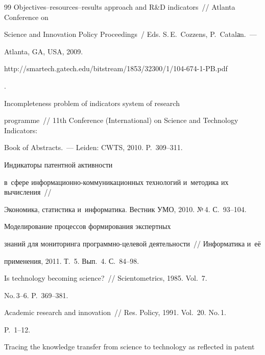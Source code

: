 {{\begin{thebibliography}{99}
Objectives--resources--results approach and R\&D indicators~/\!\!/  Atlanta Conference on 


Science and Innovation Policy Proceedings~/ Eds. S.\,E.~Cozzens, P.~Catalаn.~---


Atlanta, GA, USA, 2009.


{\sf 


http://smartech.gatech.edu/bitstream/1853/32300/1/104-674-1-PB.pdf}.




 Incompleteness problem of indicators system of research 


programme~/\!\!/ 11th Conference (International) on Science and Technology Indicators: 


Book of Abstracts.~--- Leiden: CWTS, 2010. P.~309--311.




 Индикаторы патентной активности 


в~сфере информационно-коммуникационных технологий и~методика их вычисления~/\!\!/ 


Экономика, статистика и~информатика. Вестник УМО, 2010. №\,4. С.~93--104.




 Моделирование процессов формирования экспертных 


знаний для мониторинга про\-грам\-мно-це\-ле\-вой деятельности~/\!\!/ Информатика и~её 


применения, 2011. Т.~5. Вып.~4. С.~84--98.













 Is technology becoming science?~/\!\!/ Scientometrics, 1985. Vol.~7. 


No.\,3--6. P.~369--381.







 Academic research and innovation~/\!\!/ Res. Policy, 1991. Vol.~20. No.\,1. 


P.~1--12.




 Tracing the knowledge transfer from science to technology as reflected in patent 



\end{thebibliography}}}
